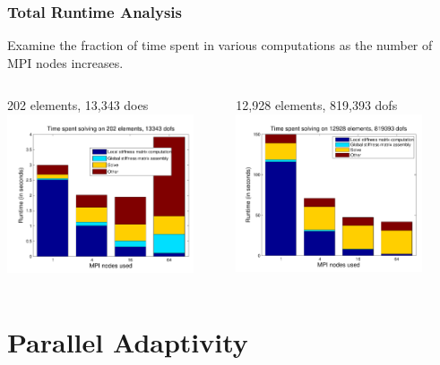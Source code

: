 \documentclass[mathserif]{beamer}
\begin{document}
\begin{frame}
\frametitle{Total Runtime Analysis}
Examine the fraction of time spent in various computations as the number of MPI nodes increases.
\begin{columns}[c]
\begin{column}{5.5cm}
\begin{block}{202 elements, 13,343 does}
\includegraphics[width=5.5cm]{../figs/scalingFigs/bar_ref0.pdf}
\end{block}
\end{column}
\begin{column}{5.5cm}
\begin{block}{12,928 elements, 819,393 dofs}
\includegraphics[width=5.5cm]{../figs/scalingFigs/bar_ref3.pdf}
\end{block}
\end{column}
\end{columns}
\end{frame}


\section{Parallel Adaptivity}
\end{document}
